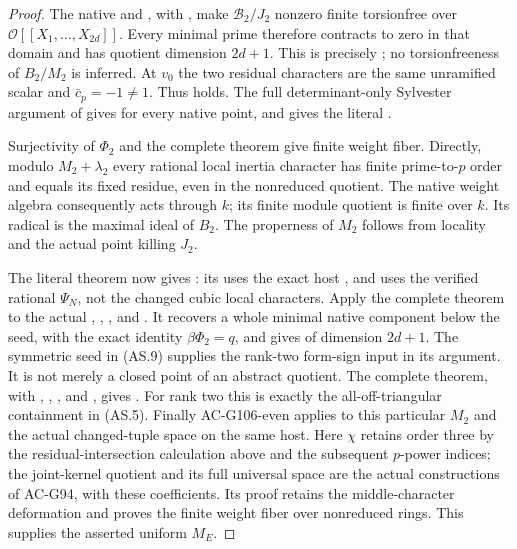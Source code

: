 \begin{proof}
The native  and , with
, make \(\mathscr B_2/J_2\) nonzero finite
torsionfree over \(\mathcal O[[X_1,\ldots,X_{2d}]]\).
Every minimal prime therefore contracts to zero in that
domain and has quotient dimension \(2d+1\).
This is precisely ; no torsionfreeness of
\(B_2/M_2\) is inferred.
At \(v_0\) the two residual characters are the same
unramified scalar and \(\bar c_p=-1\ne1\).
Thus  holds.  The full determinant-only
Sylvester argument of 
gives  for every native point, and
 gives the literal .

Surjectivity of \(\Phi_2\) and the complete
 theorem give finite weight fiber.
Directly, modulo \(M_2+\lambda_2\) every rational
local inertia character has finite prime-to-\(p\) order
and equals its fixed residue, even in the nonreduced
quotient.  The native weight algebra consequently acts
through \(k\); its finite module quotient is finite over
\(k\).  Its radical is the maximal ideal of \(B_2\).
The properness of \(M_2\) follows from locality and
the actual point killing \(J_2\).

The literal  theorem now gives :
its  uses the exact host ,
and  uses the verified rational
\(\Psi_N\), not the changed cubic local characters.
Apply the complete  theorem to the actual
, , , 
and .
It recovers a whole minimal native component below the
seed, with the exact identity \(\beta\Phi_2=q\), and
gives  of dimension \(2d+1\).
The symmetric seed in (AS.9) supplies the rank-two
form-sign input in its  argument.
It is not merely a closed point of an abstract quotient.
The complete  theorem,
with , , , 
and , gives .
For rank two this is exactly the all-off-triangular
containment in (AS.5).
Finally AC-G106-even applies to this particular \(M_2\)
and the actual changed-tuple space on the same host.
Here \(\chi\) retains order three by the residual-intersection
calculation above and the subsequent \(p\)-power indices;
the joint-kernel quotient and its full universal space are
the actual constructions of AC-G94, with these coefficients.
Its proof retains the middle-character deformation and
proves the finite weight fiber over nonreduced rings.
This supplies the asserted uniform \(M_E\).
\end{proof}

